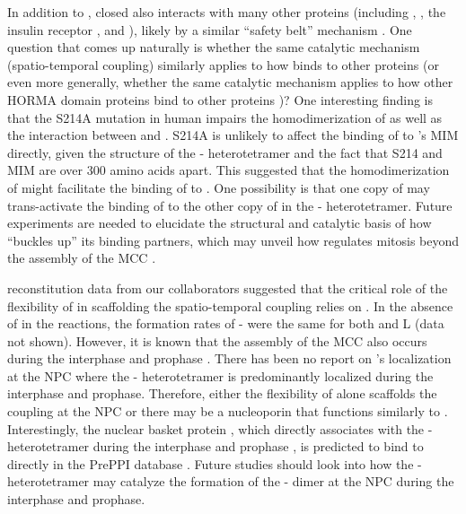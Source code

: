In addition to , closed  also interacts with many other proteins (including ,  \cite{SGO2-MAD2}, the insulin receptor \cite{MCC_IREndocytosis}, and  \cite{KIF20A-MAD2}), likely by a similar ``safety belt'' mechanism \cite{Structure1GO4}. One question that comes up naturally is whether the same catalytic mechanism (spatio-temporal coupling) similarly applies to how  binds to other proteins (or even more generally, whether the same catalytic mechanism applies to how other HORMA domain proteins bind to other proteins \cite{HORMAReview})? One interesting finding is that the S214A mutation in human  impairs the homodimerization of  as well as the interaction between  and  \cite{ATMPhosphorylatesMad1S214}. S214A is unlikely to affect the binding of  to 's MIM directly, given the structure of the - heterotetramer \cite{Structure1GO4} and the fact that S214 and MIM are over 300 amino acids apart. This suggested that the homodimerization of  might facilitate the binding of  to . One possibility is that one copy of  may trans-activate the binding of  to the other copy of  in the - heterotetramer. Future experiments are needed to elucidate the structural and catalytic basis of how  ``buckles up'' its binding partners, which may unveil how  regulates mitosis beyond the assembly of the MCC \cite{Separase-SGO2-MAD2, KIF20A-MAD2}. %

 reconstitution data from our collaborators suggested that the critical role of the flexibility of  in scaffolding the spatio-temporal coupling relies on . In the absence of  in the reactions, the formation rates of - were the same for both  and \textDelta{}L (data not shown). However, it is known that the assembly of the MCC also occurs during the interphase and prophase \cite{PremitoticMCC}. There has been no report on 's localization at the NPC where the - heterotetramer is predominantly localized during the interphase and prophase. Therefore, either the flexibility of  alone scaffolds the coupling at the NPC or there may be a nucleoporin that functions similarly to . Interestingly, the nuclear basket protein , which directly associates with the - heterotetramer during the interphase and prophase \cite{TPR-MAD1_Lee2008}, is predicted to bind to  directly in the PrePPI database \cite{PrePPI}. Future studies should look into how the - heterotetramer may catalyze the formation of the - dimer at the NPC during the interphase and prophase.

